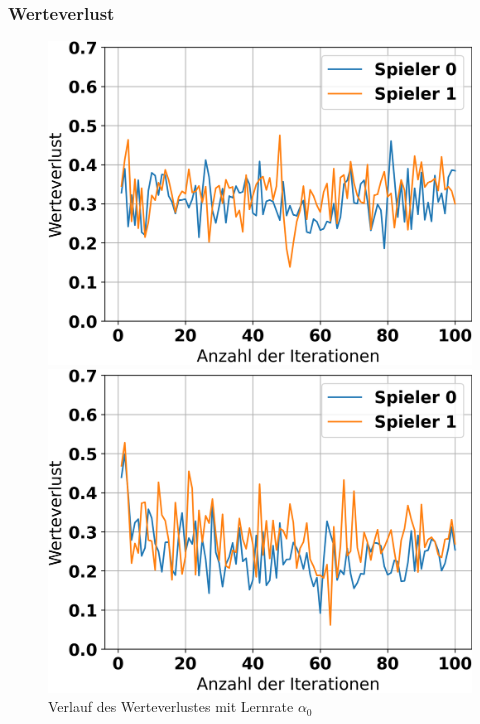 \subsubsection{Werteverlust}

\begin{figure}[H]
	\begin{minipage}[c]{0.32\linewidth}
		\includegraphics[width=\linewidth]{Bilder/ensemble-training/a_0_001/graph_value_losses.png}
		\caption{Verlauf des Werteverlustes mit Lernrate $\alpha_0$}
	\end{minipage}
	\hfill
	\begin{minipage}[c]{0.32\linewidth}
		\includegraphics[width=\linewidth]{Bilder/ensemble-training/b_0_0003/graph_value_losses.png}

\end{minipage}
\end{figure}
